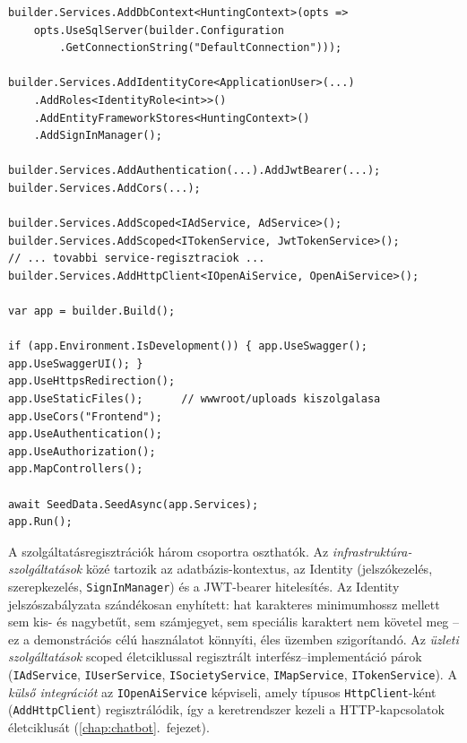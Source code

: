 \begin{lstlisting}[language={[Sharp]C}, caption={DI-regisztrációk és middleware-sorrend a \texttt{Program.cs}-ben (kivonat)}, label={lst:program-bootstrap}]
builder.Services.AddDbContext<HuntingContext>(opts =>
    opts.UseSqlServer(builder.Configuration
        .GetConnectionString("DefaultConnection")));

builder.Services.AddIdentityCore<ApplicationUser>(...)
    .AddRoles<IdentityRole<int>>()
    .AddEntityFrameworkStores<HuntingContext>()
    .AddSignInManager();

builder.Services.AddAuthentication(...).AddJwtBearer(...);
builder.Services.AddCors(...);

builder.Services.AddScoped<IAdService, AdService>();
builder.Services.AddScoped<ITokenService, JwtTokenService>();
// ... tovabbi service-regisztraciok ...
builder.Services.AddHttpClient<IOpenAiService, OpenAiService>();

var app = builder.Build();

if (app.Environment.IsDevelopment()) { app.UseSwagger(); app.UseSwaggerUI(); }
app.UseHttpsRedirection();
app.UseStaticFiles();      // wwwroot/uploads kiszolgalasa
app.UseCors("Frontend");
app.UseAuthentication();
app.UseAuthorization();
app.MapControllers();

await SeedData.SeedAsync(app.Services);
app.Run();
\end{lstlisting}

A szolgáltatásregisztrációk három csoportra oszthatók. Az \emph{infrastruktúra-szolgáltatások}
közé tartozik az adatbázis-kontextus, az Identity (jelszókezelés, szerepkezelés,
\texttt{SignInManager}) és a JWT-bearer hitelesítés. Az Identity jelszószabályzata szándékosan
enyhített: hat karakteres minimumhossz mellett sem kis- és nagybetűt, sem számjegyet, sem
speciális karaktert nem követel meg -- ez a demonstrációs célú használatot könnyíti, éles
üzemben szigorítandó. Az \emph{üzleti szolgáltatások} scoped életciklussal regisztrált
interfész--implementáció párok (\texttt{IAdService}, \texttt{IUserService},
\texttt{ISocietyService}, \texttt{IMapService}, \texttt{ITokenService}). A \emph{külső integrációt} az
\texttt{IOpenAiService} képviseli, amely típusos \texttt{HttpClient}-ként
(\texttt{AddHttpClient}) regisztrálódik, így a keretrendszer kezeli a HTTP-kapcsolatok
életciklusát (\ref{chap:chatbot}.~fejezet).

